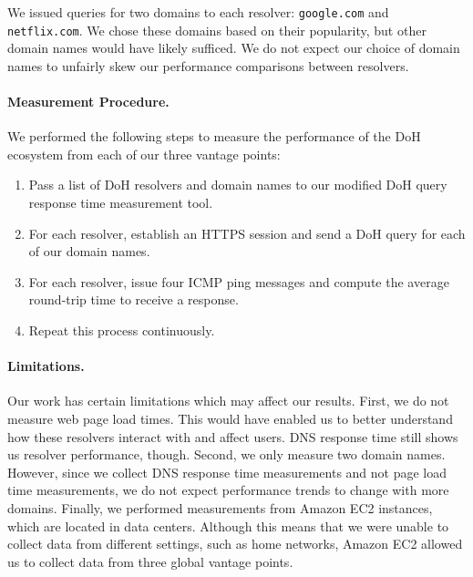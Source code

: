 We issued queries for two domains to each resolver: \texttt{google.com} and \texttt{netflix.com}.
We chose these domains based on their popularity, but other domain names would have likely sufficed.
We do not expect our choice of domain names to unfairly skew our performance comparisons between resolvers.

\paragraph{Measurement Procedure.}
We performed the following steps to measure the performance of the DoH ecosystem from each of our three vantage points:
\begin{enumerate}
    \item Pass a list of DoH resolvers and domain names to our modified DoH query response time measurement tool.
    \item For each resolver, establish an HTTPS session and send a DoH query for each of our domain names.
    \item For each resolver, issue four ICMP ping messages and compute the average round-trip time to receive a response.
    \item Repeat this process continuously.
\end{enumerate}

\paragraph{Limitations.}
Our work has certain limitations which may affect our results. 
First, we do not measure web page load times. 
This would have enabled us to better understand how these resolvers interact with and affect users. 
DNS response time still shows us resolver performance, though. 
Second, we only measure two domain names. 
However, since we collect DNS response time measurements and not page load time measurements, we do not expect performance trends to change with more domains.
Finally, we performed measurements from Amazon EC2 instances, which are located in data centers. 
Although this means that we were unable to collect data from different settings, such as home networks, Amazon EC2 allowed us to collect data from three global vantage points. 

